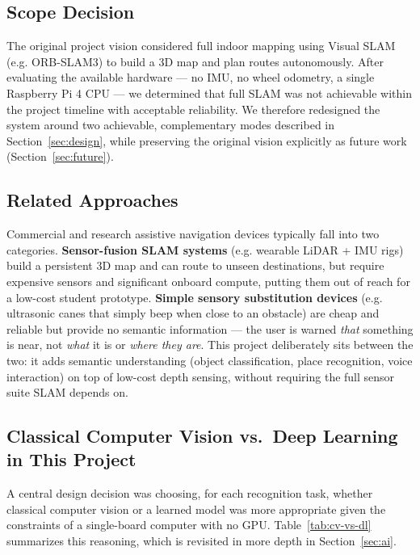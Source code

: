 \documentclass[12pt,a4paper]{article}
\begin{document}
\subsection{Scope Decision}
The original project vision considered full indoor mapping using Visual SLAM (e.g. ORB-SLAM3) to build a 3D map and plan routes autonomously. After evaluating the available hardware — no IMU, no wheel odometry, a single Raspberry Pi 4 CPU — we determined that full SLAM was not achievable within the project timeline with acceptable reliability. We therefore redesigned the system around two achievable, complementary modes described in Section~\ref{sec:design}, while preserving the original vision explicitly as future work (Section~\ref{sec:future}).

\subsection{Related Approaches}
Commercial and research assistive navigation devices typically fall into two categories. \textbf{Sensor-fusion SLAM systems} (e.g. wearable LiDAR + IMU rigs) build a persistent 3D map and can route to unseen destinations, but require expensive sensors and significant onboard compute, putting them out of reach for a low-cost student prototype. \textbf{Simple sensory substitution devices} (e.g. ultrasonic canes that simply beep when close to an obstacle) are cheap and reliable but provide no semantic information — the user is warned \emph{that} something is near, not \emph{what} it is or \emph{where they are}. This project deliberately sits between the two: it adds semantic understanding (object classification, place recognition, voice interaction) on top of low-cost depth sensing, without requiring the full sensor suite SLAM depends on.

\subsection{Classical Computer Vision vs.\ Deep Learning in This Project}
A central design decision was choosing, for each recognition task, whether classical computer vision or a learned model was more appropriate given the constraints of a single-board computer with no GPU. Table~\ref{tab:cv-vs-dl} summarizes this reasoning, which is revisited in more depth in Section~\ref{sec:ai}.
\end{document}
